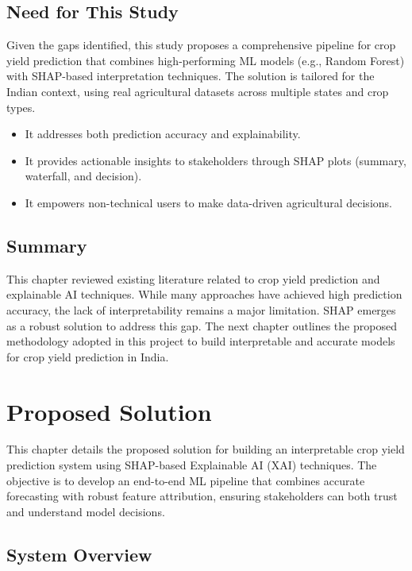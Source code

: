 \documentclass[a4paper,11pt,oneside]{book}
\begin{document}
\section{Need for This Study}

Given the gaps identified, this study proposes a comprehensive pipeline for crop yield prediction that combines high-performing ML models (e.g., Random Forest) with SHAP-based interpretation techniques. The solution is tailored for the Indian context, using real agricultural datasets across multiple states and crop types.

\begin{itemize}
    \item It addresses both prediction accuracy and explainability.
    \item It provides actionable insights to stakeholders through SHAP plots (summary, waterfall, and decision).
    \item It empowers non-technical users to make data-driven agricultural decisions.
\end{itemize}

\section{Summary}

This chapter reviewed existing literature related to crop yield prediction and explainable AI techniques. While many approaches have achieved high prediction accuracy, the lack of interpretability remains a major limitation. SHAP emerges as a robust solution to address this gap. The next chapter outlines the proposed methodology adopted in this project to build interpretable and accurate models for crop yield prediction in India.

\newpage


\chapter{Proposed Solution}

This chapter details the proposed solution for building an interpretable crop yield prediction system using SHAP-based Explainable AI (XAI) techniques. The objective is to develop an end-to-end ML pipeline that combines accurate forecasting with robust feature attribution, ensuring stakeholders can both trust and understand model decisions.

\section{System Overview}
\end{document}
